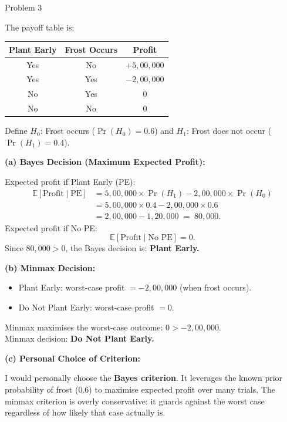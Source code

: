 \documentclass[12pt,a4paper,onecolumn]{exam}
\newcommand{\questionheader}[1]{%
  \begin{tcolorbox}[
    enhanced,
    colback=black,
    coltext=white,
    boxrule=0pt,
    fontupper=\Large\bfseries,
    arc=4mm
  ]
  #1
  \end{tcolorbox}%
}
\begin{document}
\questionheader{Problem 3}

\begin{solution}

The payoff table is:
\begin{center}
\begin{tabular}{ccc}
\toprule
Plant Early & Frost Occurs & Profit \\
\midrule
Yes & No  & $+5{,}00{,}000$ \\
Yes & Yes & $-2{,}00{,}000$ \\
No  & Yes & $0$ \\
No  & No  & $0$ \\
\bottomrule
\end{tabular}
\end{center}

Define $H_0$: Frost occurs ($\Pr(H_0)=0.6$) and $H_1$: Frost does not occur ($\Pr(H_1)=0.4$).

\textbf{(a) Bayes Decision (Maximum Expected Profit):}

Expected profit if Plant Early (PE):
\begin{align*}
\mathbb{E}[\text{Profit} \mid \text{PE}]
&= 5{,}00{,}000 \times \Pr(H_1) - 2{,}00{,}000 \times \Pr(H_0) \\[4pt]
&= 5{,}00{,}000 \times 0.4 - 2{,}00{,}000 \times 0.6 \\[4pt]
&= 2{,}00{,}000 - 1{,}20{,}000 \;=\; 80{,}000.
\end{align*}
Expected profit if No PE:
\[
\mathbb{E}[\text{Profit} \mid \text{No PE}] = 0.
\]
Since $80{,}000 > 0$, the Bayes decision is: \textbf{Plant Early.}

\textbf{(b) Minmax Decision:}

\begin{itemize}
\item Plant Early: worst-case profit $= -2{,}00{,}000$ (when frost occurs).
\item Do Not Plant Early: worst-case profit $= 0$.
\end{itemize}
Minmax maximises the worst-case outcome: $0 > -2{,}00{,}000$.\\
Minmax decision: \textbf{Do Not Plant Early.}

\textbf{(c) Personal Choice of Criterion:}

I would personally choose the \textbf{Bayes criterion}. It leverages the known prior probability of frost ($0.6$) to maximise expected profit over many trials. The minmax criterion is overly conservative: it guards against the worst case regardless of how likely that case actually is.

\end{solution}
\end{document}
